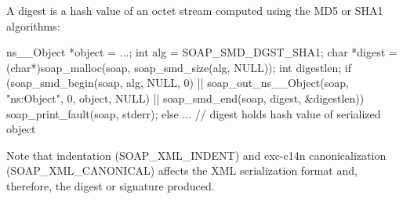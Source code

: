 A digest is a hash value of an octet stream computed using the MD5 or SHA1 algorithms:


\begin{DoxyCode}
    ns__Object *object = ...;
    int alg = SOAP_SMD_DGST_SHA1;
    char *digest = (char*)soap_malloc(soap, soap_smd_size(alg, NULL));
    int digestlen;
    if (soap_smd_begin(soap, alg, NULL, 0)
     || soap_out_ns__Object(soap, "ns:Object", 0, object, NULL)
     || soap_smd_end(soap, digest, &digestlen))
      soap_print_fault(soap, stderr);
    else
      ... // digest holds hash value of serialized object
\end{DoxyCode}


Note that indentation (SOAP\_\-XML\_\-INDENT) and exc-\/c14n canonicalization (SOAP\_\-XML\_\-CANONICAL) affects the XML serialization format and, therefore, the digest or signature produced. 